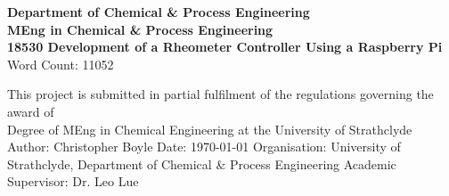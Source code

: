 \documentclass[twoside,a4]{report}
\def\atitle{Development of a Rheometer Controller Using a Raspberry Pi}
\def\thewords{11052} %
\begin{document}
	\begin{titlepage}
		\centering
		\vskip3cm
		{
			\bfseries\Large
			Department of Chemical \& Process Engineering\\
			\vskip1cm
			MEng in Chemical \& Process Engineering\\
			18530
			\vskip3cm
			\LARGE\atitle
		}
		\vskip3cm
		{\small Word Count: \thewords}
		\vskip1cm
		\begin{flushleft}
			This project is submitted in partial fulfilment of the regulations governing the award of \\
			Degree of MEng in Chemical Engineering at the University of Strathclyde
			\vskip2cm
			Author: Christopher Boyle \hfill Date: \today \newline
			\vskip1cm
			Organisation: University of Strathclyde, Department of Chemical \& Process Engineering \newline
			Academic Supervisor: Dr. Leo Lue
		\end{flushleft}
	\end{titlepage}
\end{document}
